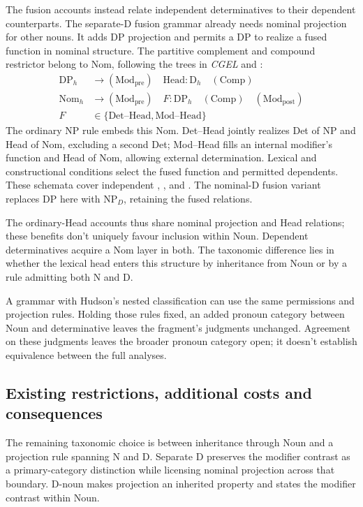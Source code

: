 \documentclass[12pt]{article}
\begin{document}
The fusion accounts instead relate independent determinatives to their dependent counterparts. The separate-D fusion grammar already needs nominal projection for other nouns. It adds DP projection and permits a DP to realize a fused function in nominal structure. The partitive complement and compound restrictor belong to Nom, following the trees in \textit{CGEL} and \textcite[582]{Payne2007}:
\[
\begin{aligned}
\mathrm{DP}_{h} &\to (\mathrm{Mod}_{\mathrm{pre}})\quad \mathrm{Head}:\mathrm{D}_{h}\quad (\mathrm{Comp}) \\
\mathrm{Nom}_{h} &\to (\mathrm{Mod}_{\mathrm{pre}})\quad F:\mathrm{DP}_{h}\quad (\mathrm{Comp})\quad (\mathrm{Mod}_{\mathrm{post}}) \\
F&\in\{\mathrm{Det\text{--}Head},\mathrm{Mod\text{--}Head}\}
\end{aligned}
\]
The ordinary NP rule embeds this Nom. Det--Head jointly realizes Det of NP and Head of Nom, excluding a second Det; Mod--Head fills an internal modifier's function and Head of Nom, allowing external determination. Lexical and constructional conditions select the fused function and permitted dependents. These schemata cover independent , ,  and . The nominal-D fusion variant replaces DP here with $\mathrm{NP}_{D}$, retaining the fused relations.

The ordinary-Head accounts thus share nominal projection and Head relations; these benefits don't uniquely favour inclusion within Noun. Dependent determinatives acquire a Nom layer in both. The taxonomic difference lies in whether the lexical head enters this structure by inheritance from Noun or by a rule admitting both N and D.

A grammar with Hudson's nested classification can use the same permissions and projection rules. Holding those rules fixed, an added pronoun category between Noun and determinative leaves the fragment's judgments unchanged. Agreement on these judgments leaves the broader pronoun category open; it doesn't establish equivalence between the full analyses.

\subsection{Existing restrictions, additional costs and consequences}\label{sec:costs}

The remaining taxonomic choice is between inheritance through Noun and a projection rule spanning N and D. Separate D preserves the modifier contrast as a primary-category distinction while licensing nominal projection across that boundary. D-noun makes projection an inherited property and states the modifier contrast within Noun.
\end{document}
